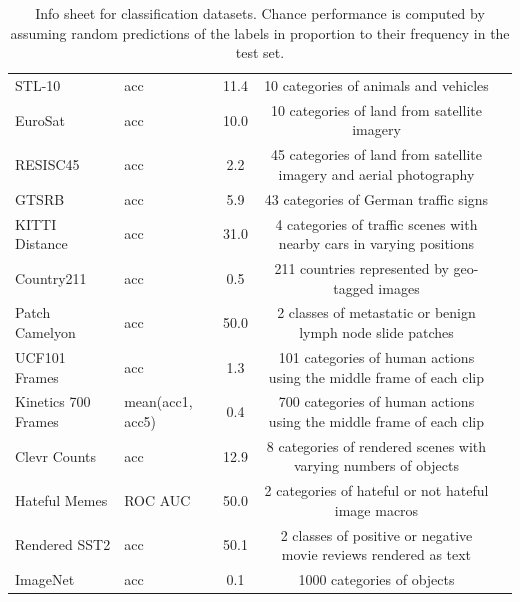 \documentclass[10pt,twocolumn,letterpaper]{article}
\begin{document}
\begin{table}[h]
\begin{tabular}{l l c c c}
STL-10 \cite{Coates2011AnAO} & acc & 11.4 & 10 categories of animals and vehicles \\
EuroSat \cite{Helber2019EuroSATAN} & acc & 10.0 & 10 categories of land from satellite imagery \\
RESISC45 \cite{Cheng2017RemoteSI} & acc & 2.2 & 45 categories of land from satellite imagery and aerial photography\\
GTSRB \cite{Stallkamp2011TheGT} & acc & 5.9 & 43 categories of German traffic signs \\
KITTI Distance \cite{Geiger2012AreWR} & acc & 31.0 & 4 categories of traffic scenes with nearby cars in varying positions \\
Country211 \cite{Radford2021LearningTV, Thomee2016YFCC100MTN} & acc & 0.5 & 211 countries represented by geo-tagged images \\
Patch Camelyon \cite{Veeling2018-qh, EhteshamiBejnordi2017DiagnosticAO} & acc & 50.0 & 2 classes of metastatic or benign lymph node slide patches \\
UCF101 Frames \cite{Soomro2012UCF101AD} & acc & 1.3 & 101 categories of human actions using the middle frame of each clip \\
Kinetics 700 Frames \cite{Carreira2019ASN} & mean(acc1, acc5) & 0.4 & 700 categories of human actions using the middle frame of each clip \\
Clevr Counts \cite{Johnson2017CLEVRAD} & acc & 12.9 & 8 categories of rendered scenes with varying numbers of objects \\
Hateful Memes \cite{Kiela2020TheHM} & ROC AUC & 50.0 & 2 categories of hateful or not hateful image macros \\
Rendered SST2 \cite{Radford2021LearningTV, Socher2013RecursiveDM} & acc & 50.1 & 2 classes of positive or negative movie reviews rendered as text \\
ImageNet \cite{Russakovsky2015ImageNetLS} & acc & 0.1 & 1000 categories of objects\\
\end{tabular}
\caption{Info sheet for classification datasets. Chance performance is computed by assuming random predictions of the labels in proportion to their frequency in the test set.}
\label{tab:infosheet}
\end{table}
\end{document}
